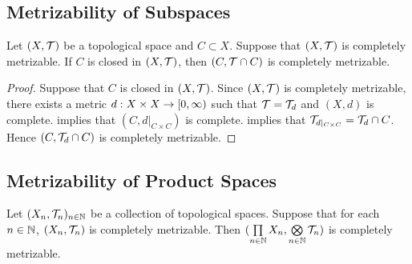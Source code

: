 \documentclass{book}
\begin{document}
\subsection{Metrizability of Subspaces}

\begin{ex} 
	Let $(X, \mathcal{T})$ be a topological space and $C \subset X$. Suppose that $(X, \mathcal{T})$ is completely metrizable. If $C$ is closed in $(X, \mathcal{T})$, then $(C, \mathcal{T} \cap C)$ is completely metrizable. 
\end{ex}

\begin{proof}
	Suppose that $C$ is closed in $(X, \mathcal{T})$. Since $(X, \mathcal{T})$ is completely metrizable, there exists a metric $d: X \times X \rightarrow	[0,\infty)$ such that $\mathcal{T} = \mathcal{T}_d$ and $(X, d)$ is complete.  implies that $(C, d|_{C \times C})$ is complete.  implies that $\mathcal{T}_{d|_{C \times C}} = \mathcal{T}_d \cap C$. Hence $(C, \mathcal{T}_d \cap C)$ is completely metrizable. 
\end{proof}


























\subsection{Metrizability of Product Spaces}

\begin{ex}
	
\end{ex}

\begin{ex} 
	Let $(X_n, \mathcal{T}_n)_{n \in \mathbb{N}}$ be a collection of topological spaces. Suppose that for each $n \in \mathbb{N}$, $(X_n, \mathcal{T}_n)$ is completely metrizable. Then $(\prod\limits_{n \in \mathbb{N}} X_n, \bigotimes\limits_{n \in \mathbb{N}} \mathcal{T}_n)$ is completely metrizable.  
\end{ex}
\end{document}
